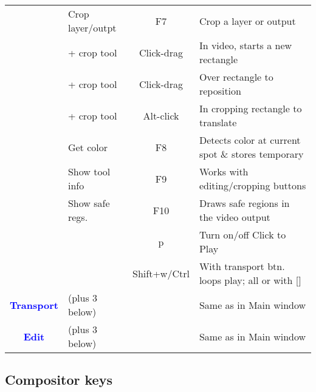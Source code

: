 \begin{center}
\begin{longtable}{ >{\bfseries}c l c p{6cm}}
        & Crop layer/outpt & F7 & Crop a layer or output \\        
        & + crop tool & Click-drag & In video, starts a new rectangle \\        
        &  + crop tool & Click-drag & Over rectangle to reposition \\        
        &  + crop tool & Alt-click & In cropping rectangle to translate \\         
        & Get color & F8 & Detects color at current spot \& stores temporary \\        
        & Show tool info & F9 & Works with editing/cropping buttons \\        
        & Show safe regs. & F10 & Draws safe regions in the video output \\        
        &  & p & Turn on/off Click to Play \\         
        &  & Shift+w/Ctrl & With transport btn. loops play; all or with [] \\
        \midrule
        \textcolor{blue}{Transport} & (plus 3 below) &  & Same as in Main window \\
        \midrule
        \textcolor{blue}{Edit} & (plus 3 below) &  & Same as in Main window \\        
        
        \bottomrule  
    \end{longtable}
\end{center}

\subsection{Compositor keys }%
\label{ssec:compositor_keys}

